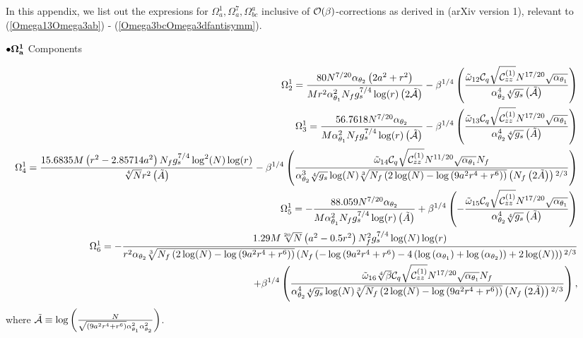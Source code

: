 \documentclass[a4paper,11pt,fleqn]{article}
\theoremstyle{plain}
\theoremstyle{definition}
\begin{document}
In this appendix, we list out the expresions for $\Omega^1_a, \Omega^7_a, \Omega^a_{bc}$ inclusive of ${\cal O}(\beta)$-corrections as derived in \cite{ACMS} (arXiv version 1), relevant to (\ref{Omega13Omega3ab}) - (\ref{Omega3bcOmega3dfantisymm}).

\noindent$\bullet{\bf \Omega^1_a}$ Components

{\scriptsize
\begin{eqnarray}
\label{Omega1a}
& & \hskip -0.5in \Omega^1_2=\frac{80 N^{7/20} \alpha _{\theta_2} \left(2 a^2+r^2\right)}{M r^2 \alpha _{\theta_1}^2 N_f g_s^{7/4} \log (r) \left(2\tilde{\cal A}\right)} -\beta^{1/4}\left(\frac{\tilde{\omega}_{12} {\cal C}_q \sqrt{{\cal C}_{zz}^{(1)}} N^{17/20} \sqrt{\alpha _{\theta_1}}}{\alpha _{\theta_2}^4 \sqrt[4]{g_s} \left(\tilde{\cal A}\right)}\right)\nonumber\\
   & & \hskip -0.5in \Omega^1_3=\frac{56.7618 N^{7/20} \alpha _{\theta_2}}{M \alpha _{\theta_1}^2 N_f g_s^{7/4} \log (r) \left(\tilde{\cal A}\right)}  -\beta^{1/4}\left(\frac{{\tilde{\omega}_{13}} {\cal C}_q \sqrt{{\cal C}_{zz}^{(1)}} N^{17/20} \sqrt{\alpha _{\theta_1}}}{\alpha _{\theta_2}^4 \sqrt[4]{g_s} \left(\tilde{A}\right)}\right) \nonumber\\
   & & \hskip -0.5in \Omega^1_4=\frac{15.6835 M \left(r^2-2.85714 a^2\right) N_f g_s^{7/4} \log ^2(N) \log (r)}{\sqrt[4]{N} r^2 \left(\tilde{A}\right)}  -\beta^{1/4}\left(\frac{\tilde{\omega}_{14} {\cal C}_q \sqrt{{\cal C}_{zz}^{(1)}} N^{11/20} \sqrt{\alpha _{\theta_1}} N_f}{\alpha _{\theta_2}^3 \sqrt[4]{g_s} \log (N) \sqrt[3]{N_f \left(2 \log (N)-\log
   \left(9 a^2 r^4+r^6\right)\right)} \left(N_f \left(2\tilde{A}\right)\right){}^{2/3}}\right)\nonumber\\   
   & & \hskip -0.5in \Omega^1_5=-\frac{88.059 N^{7/20} \alpha _{\theta_2}}{M \alpha _{\theta_1}^2 N_f g_s^{7/4} \log (r) \left(\tilde{A}\right)} +\beta^{1/4}\left(-\frac{\tilde{\omega}_{15} {\cal C}_q \sqrt{{\cal C}_{zz}^{(1)}} N^{17/20} \sqrt{\alpha _{\theta_1}}}{\alpha _{\theta_2}^4 \sqrt[4]{g_s} \left(\tilde{A}\right)}\right)\nonumber\\
   & & \hskip -0.5in \Omega^1_6=-\frac{1.29 M \sqrt[20]{N} \left(a^2-0.5 r^2\right) N_f^2 g_s^{7/4} \log (N) \log (r)}{r^2 \alpha _{\theta_2} \sqrt[3]{N_f \left(2 \log (N)-\log \left(9 a^2 r^4+r^6\right)\right)} \left(N_f
   \left(-\log \left(9 a^2 r^4+r^6\right)-4 \left(\log \left(\alpha _{\theta_1}\right)+\log \left(\alpha _{\theta_2}\right)\right)+2 \log (N)\right)\right){}^{2/3}} \nonumber\\
   & & \hskip -0.5in +\beta^{1/4}\left(\frac{\tilde{\omega}_{16} \sqrt[4]{\beta } {\cal C}_q \sqrt{{\cal C}_{zz}^{(1)}} N^{17/20} \sqrt{\alpha _{\theta_1}} N_f}{\alpha _{\theta_2}^4 \sqrt[4]{g_s} \log (N) \sqrt[3]{N_f
   \left(2 \log (N)-\log \left(9 a^2 r^4+r^6\right)\right)} \left(N_f \left(2\tilde{A}\right)\right){}^{2/3}}\right),\nonumber\\
\end{eqnarray}
}
where $\tilde{\cal A} \equiv  \log\left(\frac{N}{\sqrt{\left(9 a^2 r^4+r^6\right)}\alpha^2_{\theta_1}\alpha^2_{\theta_2}}\right)$.
\end{document}
